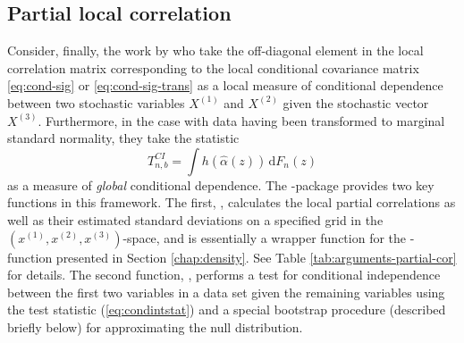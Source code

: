 
\subsection{Partial local correlation}
\label{chap:partial}

Consider, finally, the work by \citet{otne:tjos:2019} who take the off-diagonal element in the local correlation matrix corresponding to the local conditional covariance matrix \eqref{eq:cond-sig} or \eqref{eq:cond-sig-trans} as a local measure of conditional dependence between two stochastic variables \(X^{(1)}\) and \(X^{(2)}\) given the stochastic vector \(X^{(3)}\). Furthermore, in the case with data having been transformed to marginal standard normality, they take the statistic
\begin{equation}
T^{CI}_{n, b} = \int h(\widehat\alpha(z)) \, \textrm{d}F_n(z)
\label{eq:condintstat}
\end{equation}
as a measure of \emph{global} conditional dependence. The -package provides two key functions in this framework. The first, , calculates the local partial correlations as well as their estimated standard deviations on a specified grid in the \((x^{(1)}, x^{(2)}, x^{(3)})\)-space, and is essentially a wrapper function for the -function presented in Section \ref{chap:density}. See Table \ref{tab:arguments-partial-cor} for details. The second function, , performs a test for conditional independence between the first two variables in a data set given the remaining variables using the test statistic (\ref{eq:condintstat}) and a special bootstrap procedure (described briefly below) for approximating the null distribution.

